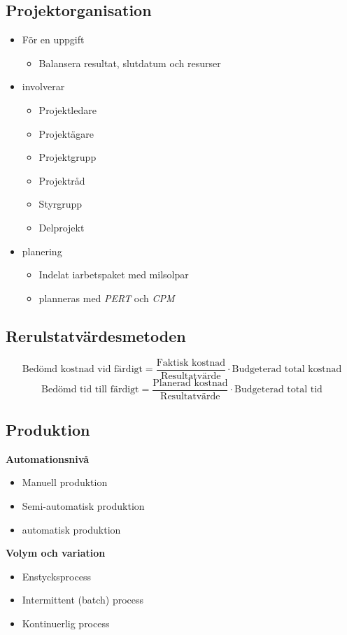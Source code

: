 \documentclass{article}
\begin{document}
\subsection{Projektorganisation}
\begin{itemize}
    \item För en uppgift
    \begin{itemize}
        \item Balansera resultat, slutdatum och resurser
    \end{itemize}
    \item involverar
    \begin{itemize}
        \item Projektledare
        \item Projektägare
        \item Projektgrupp
        \item Projektråd 
        \item Styrgrupp
        \item Delprojekt
    \end{itemize}
    \item planering
    \begin{itemize}
        \item Indelat iarbetspaket med milsolpar 
        \item planneras med \textit{PERT} och \textit{CPM} %
    \end{itemize}
\end{itemize}

\subsection{Rerulstatvärdesmetoden}
\begin{equation*}
    \text{Bedömd kostnad vid färdigt} = \frac{\text{Faktisk kostnad}}{\text{Resultatvärde}} 
    \cdot \text{Budgeterad total kostnad}
\end{equation*}
\begin{equation*}
    \text{Bedömd tid till färdigt} = \frac{\text{Planerad kostnad}}{\text{Resultatvärde}} 
    \cdot \text{Budgeterad total tid}
\end{equation*}

\subsection{Produktion}
\textbf{Automationsnivå}
\begin{itemize}
    \item Manuell produktion
    \item Semi-automatisk produktion
    \item automatisk produktion
\end{itemize}
\textbf{Volym och variation}
\begin{itemize}
    \item Enstycksprocess
    \item Intermittent (batch) process 
    \item Kontinuerlig process
\end{itemize}
\end{document}
